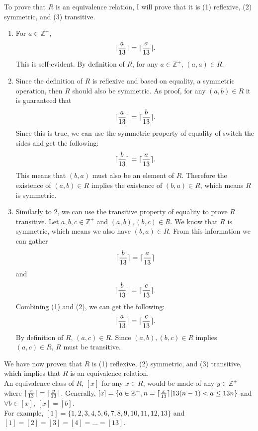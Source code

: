 \documentclass{article}
\DeclarePairedDelimiter{\ceil}{\lceil}{\rceil}
\begin{document}
\section{}
To prove that $R$ is an equivalence relation, I will prove that it is (1) reflexive, (2) symmetric, and (3) transitive.
\begin{enumerate}
    \item For $a \in \mathbb{Z}^+$,
    \begin{equation*}
        \ceil{\frac{a}{13}} = \ceil{\frac{a}{13}}.
    \end{equation*}
    This is self-evident. By definition of $R$, for any $a \in \mathbb{Z}^+$, $(a,a) \in R$.
    \item Since the definition of $R$ is reflexive and based on equality, a symmetric operation, then $R$ should also be symmetric. As proof, for any $(a,b) \in R$ it is guaranteed that
    \begin{equation*}
        \ceil{\frac{a}{13}} = \ceil{\frac{b}{13}}.
    \end{equation*}
    Since this is true, we can use the symmetric property of equality of switch the sides and get the following: 
    \begin{equation*}
        \ceil{\frac{b}{13}} = \ceil{\frac{a}{13}}.
    \end{equation*}
    This means that $(b,a)$ must also be an element of $R$. Therefore the existence of $(a,b) \in R$ implies the existence of $(b,a) \in R$, which means $R$ is symmetric.
    \item Similarly to 2, we can use the transitive property of equality to prove $R$ transitive. Let $a,b,c \in \mathbb{Z}^+$ and $(a,b),(b,c) \in R$. We know that $R$ is symmetric, which means we also have $(b,a) \in R$. From this information we can gather
    \begin{equation}
        \ceil{\frac{b}{13}} = \ceil{\frac{a}{13}}
    \end{equation}
    and
    \begin{equation}
        \ceil{\frac{b}{13}} = \ceil{\frac{c}{13}}.
    \end{equation}
    Combining (1) and (2), we can get the following:
    \begin{equation*}
        \ceil{\frac{a}{13}} = \ceil{\frac{c}{13}}.
    \end{equation*}
    By definition of $R$, $(a,c) \in R$. Since $(a,b),(b,c) \in R$ implies $(a,c) \in R$, $R$ must be transitive.
\end{enumerate}
We have now proven that $R$ is (1) reflexive, (2) symmetric, and (3) transitive, which implies that $R$ is an equivalence relation. \\
An equivalence class of $R$, $[x]$ for any $x \in R$, would be made of any $y \in \mathbb{Z}^+$ where $\ceil{\frac{x}{13}} = \ceil{\frac{y}{13}}$.
Generally, $[x]= \{a \in \mathbb{Z}^+, n = \ceil{\frac{x}{13}} | 13(n-1) < a \leq 13n \} $ and $\forall b \in [x]$, $[x] = [b]$. \\
For example, $[1] = \{1, 2, 3, 4, 5, 6, 7, 8, 9, 10, 11, 12, 13\}$ and $[1] = [2] = [3] = [4] = \dots = [13]$.
\end{document}
